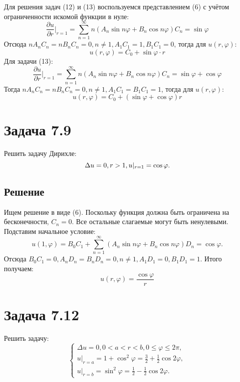 \documentclass[11pt]{article}
\begin{document}
Для решения задач (12) и (13) воспользуемся представлением (6) с учётом ограниченности искомой функции в нуле:
\begin{equation*}
\frac{\partial u}{\partial r}\bigg|_{r = 1} = \sum_{n = 1}^{\infty}n(A_n\sin n\varphi + B_n\cos n\varphi)C_n = \sin\varphi
\end{equation*}
Отсюда $nA_nC_n = nB_nC_n = 0, n \neq 1, A_1C_1 = 1, B_1C_1 = 0$, тогда для $u(r, \varphi)$:
\begin{equation}
u(r, \varphi) = C_0 + \sin\varphi\cdot r
\end{equation}
Для задачи (13):
\begin{equation*}
\frac{\partial u}{\partial r}\bigg|_{r = 1} = \sum_{n = 1}^{\infty}n(A_n\sin n\varphi + B_n\cos n\varphi)C_n = \sin\varphi + \cos\varphi
\end{equation*}
Тогда $nA_nC_n = nB_nC_n = 0, n \neq 1, A_1C_1 = B_1C_1 = 1$, тогда для $u(r, \varphi)$:
\begin{equation}
u(r, \varphi) = C_0 + (\sin\varphi + \cos\varphi)r
\end{equation}
\section{Задача 7.9}
\label{sec:org5204541}
Решить задачу Дирихле:
\begin{equation}
\Delta u = 0, r > 1, \\
u|_{r = 1} = \cos\varphi.
\end{equation}
\subsection{Решение}
\label{sec:org371cfe1}
Ищем решение в виде (6). Поскольку функция должна быть ограничена на бесконечности, $C_n = 0$.
Все остальные слагаемые могут быть ненулевыми. Подставим начальное условие:
\begin{equation*}
u(1, \varphi) = B_0C_1 + \sum_{n = 1}^{\infty}(A_n\sin n\varphi + B_n\cos n\varphi)D_n = \cos\varphi.
\end{equation*}
Отсюда $B_0C_1 = 0, A_nD_n = B_nD_n = 0, n \neq 1, A_1D_1 = 0, B_1D_1 = 1$. Итого получаем:
\begin{equation}
u(r, \varphi) = \frac{\cos\varphi}r
\end{equation}
\section{Задача 7.12}
\label{sec:org8d982ae}
Решить задачу:
\begin{equation}
\begin{cases}
\Delta u = 0, 0 < a < r < b, 0 \leq \varphi \leq 2\pi, \\
u|_{r = a} = 1 + \cos^2\varphi = \frac32 + \frac12\cos2\varphi, \\
u|_{r = b} = \sin^2\varphi = \frac12 - \frac12\cos2\varphi.
\end{cases}
\end{equation}
\end{document}
